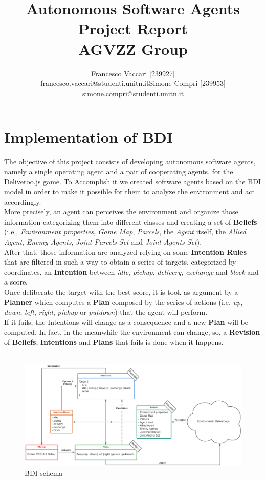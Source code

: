\documentclass[a4paper, 11pt]{article}
\title{\Huge{Autonomous Software Agents} \\ \Large{Project Report} \\ \footnotesize{AGVZZ Group}}
\author{
\begin{tabular}{cc}
\parbox{7cm}{\centering Francesco Vaccari [239927] \\ \small{\centering francesco.vaccari@studenti.unitn.it}} & 
\parbox{7cm}{\centering Simone Compri [239953] \\ \small{\centering simone.compri@studenti.unitn.it}}
\end{tabular}
}
\date{}
\begin{document}
\maketitle
\tableofcontents


\pagebreak

\section{Implementation of BDI}

The objective of this project consists of developing autonomous software agents, namely a single operating agent and a pair of cooperating agents, for the Deliveroo.js game.
To Accomplish it we created software agents based on the BDI model in order to make it possible for them to analyze the environment and act accordingly.\\
More precisely, an agent can perceives the environment and organize those information categorizing them into different classes and creating a set of \textbf{Beliefs} (i.e., \emph{Environment properties}, \emph{Game Map}, \emph{Parcels}, the \emph{Agent} itself, the \emph{Allied Agent}, \emph{Enemy Agents}, \emph{Joint Parcels Set} and \emph{Joint Agents Set}).\\
After that, those information are analyzed relying on some \textbf{Intention Rules} that are filtered in such a way to obtain a series of targets, categorized by coordinates, an \textbf{Intention} between \emph{idle}, \emph{pickup}, \emph{delivery}, \emph{exchange} and \emph{block} and a score.\\
Once deliberate the target with the best score, it is took as argument by a \textbf{Planner} which computes a \textbf{Plan} composed by the series of actions (i.e. \emph{up}, \emph{down}, \emph{left}, \emph{right}, \emph{pickup} or \emph{putdown}) that the agent will perform.\\
If it fails, the Intentions will change as a consequence and a new \textbf{Plan} will be computed. In fact, in the meanwhile the environment can change, so, a \textbf{Revision} of \textbf{Beliefs}, \textbf{Intentions} and \textbf{Plans} that fails is done when it happens.\\
\\

\begin{figure}[h]
    \includegraphics[width=\textwidth]{images/BDI schema.png}
    \caption{BDI schema}
    \centering
\end{figure}
\end{document}
